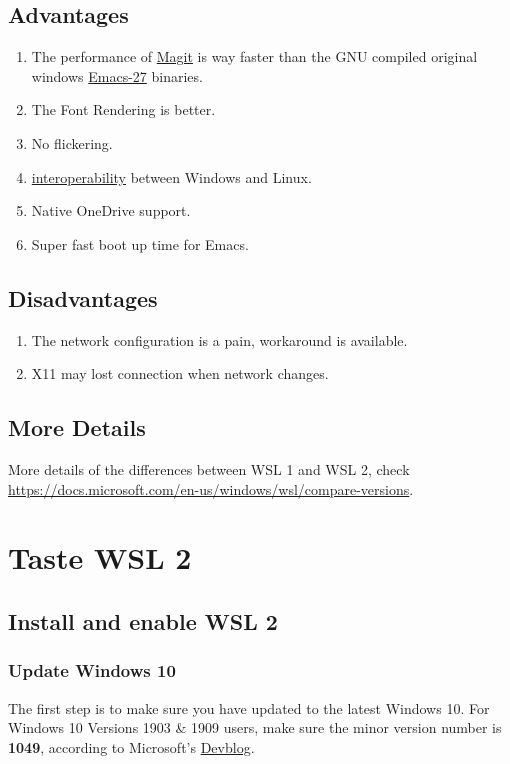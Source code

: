 \documentclass[10pt]{article}
\begin{document}
\subsection{Advantages}
\label{sec:orgb43f397}
\begin{enumerate}
\item The performance of \href{https://github.com/magit/magit}{Magit} is way faster than the GNU compiled original windows \href{https://ftp.gnu.org/gnu/emacs/windows/emacs-27/}{Emacs-27} binaries.
\item The Font Rendering is better.
\item No flickering.
\item \href{https://docs.microsoft.com/en-us/windows/wsl/interop}{interoperability} between Windows and Linux.
\item Native OneDrive support.
\item Super fast boot up time for Emacs.
\end{enumerate}

\subsection{Disadvantages}
\label{sec:org5bae775}
\begin{enumerate}
\item The network configuration is a pain, workaround is available.
\item X11 may lost connection when network changes.
\end{enumerate}

\subsection{More Details}
\label{sec:orgce6ffa0}
More details of the differences between WSL 1 and WSL 2, check \url{https://docs.microsoft.com/en-us/windows/wsl/compare-versions}.


\section{Taste WSL 2}
\label{sec:orgfbaaffc}
\subsection{Install and enable WSL 2}
\label{sec:org21b82b0}
\subsubsection{Update Windows 10}
\label{sec:org62593cc}
The first step is to make sure you have updated to the latest Windows 10. For Windows 10 Versions 1903 \& 1909 users, make sure the minor version number is \textbf{1049}, according to Microsoft's \href{https://devblogs.microsoft.com/commandline/wsl-2-support-is-coming-to-windows-10-versions-1903-and-1909/}{Devblog}.
\end{document}
